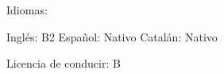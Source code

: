 \documentclass[]{awesome-cv}
\begin{document}
\vspace{2mm}
\begin{cventries}
	\vspace{2mm}
	\cventry
	{Idiomas:}
	{}
	{}
	{}
	{\begin{cvsectionnormaltext} 
		\item{Inglés: B2 \newline \vspace{2mm} Español: Nativo \newline \vspace{2mm} Catalán: Nativo}
	\end{cvsectionnormaltext}}
 
	\cventry
	{Licencia de conducir: B}
	{}
	{}
	{}
    {}

\end{cventries}
\end{document}
